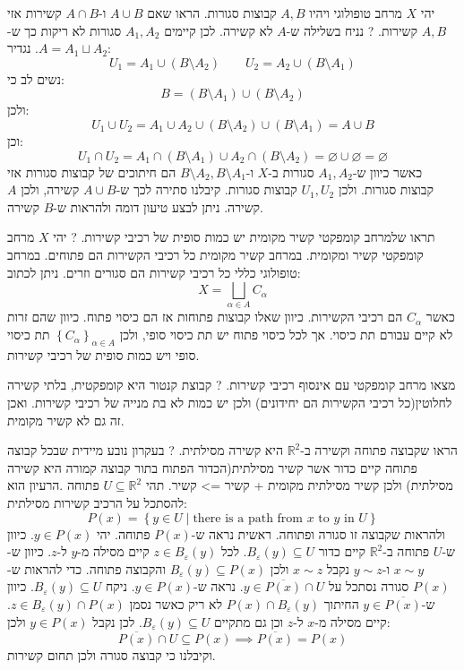 \documentclass{tstextbook}
\begin{document}
יהי \(X\) מרחב טופולוגי ויהיו \(A,B\) קבוצות סגורות. הראו שאם \(A\cup B\) ו-\(A\cap B\) קשירות אזי \(A,B\) קשירות.
?
נניח בשלילה ש-\(A\) לא קשירה. לכן קיימים \(A_{1},A_{2}\) סגורות לא ריקות כך ש-\(A=A_{1}\sqcup A_{2}\). נגדיר:
$$U_{1}=A_{1}\cup\left( B\setminus  A_{2} \right)\qquad U_{2}=A_{2}\cup \left( B\setminus  A_{1} \right)$$
נשים לב כי:
$$B=\left( B \setminus  A_{1} \right)\cup\left(  B \setminus  A_{2} \right)$$
ולכן:
$$U_{1}\cup U_{2}=A_{1}\cup A_{2}\cup\left( B\setminus  A_{2} \right)\cup \left( B\setminus  A_{1} \right)=A\cup B$$
וכן:
$$U_{1}\cap U_{2}=A_{1}\cap \left( B \setminus  A_{1} \right)\cup A_{2} \cap \left( B \setminus  A_{2} \right)=\varnothing \cup \varnothing =\varnothing $$
כאשר כיוון ש-\(A_{1},A_{2}\) סגורות ב-\(X\) ו-\(B \setminus A_{2},B\setminus A_{1}\) הם חיתוכים של קבוצות סגורות אזי קבוצות סגורות. ולכן \(U_{1},U_{2}\) קבוצות סגורות. קיבלנו סתירה לכך ש-\(A\cup B\) קשירה, ולכן \(A\) קשירה. ניתן לבצע טיעון דומה ולהראות ש-\(B\) קשירה.

תראו שלמרחב קומפקטי קשיר מקומית יש כמות סופית של רכיבי קשירות.
?
יהי \(X\) מרחב קומפקטי קשיר ומקומית. במרחב קשיר מקומית כל רכיבי הקשירות הם פתוחים. במרחב טופולוגי כללי כל רכיבי קשירות הם סגורים וזרים. ניתן לכתוב:
$$X=\bigsqcup_{\alpha \in A}C_{\alpha}$$
כאשר \(C_{\alpha}\) הם רכיבי הקשירות. כיוון שאלו קבוצות פתוחות אז הם כיסוי פתוח. כיוון שהם זרות לא קיים עבורם תת כיסוי. אך לכל כיסוי פתוח יש תת כיסוי סופי, ולכן \(\left\{  C_{\alpha}  \right\}_{\alpha \in A}\) תת כיסוי סופי ויש כמות סופית של רכיבי קשירות.

מצאו מרחב קומפקטי עם אינסוף רכיבי קשירות.
?
קבוצת קנטור היא קומפקטית, בלתי קשירה לחלוטין(כל רכיבי הקשירות הם יחידונים) ולכן יש כמות לא בת מנייה של רכיבי קשירות. ואכן זה גם לא קשיר מקומית.

הראו שקבוצה פתוחה וקשירה ב-\(\mathbb{R}^{2}\) היא קשירה מסילתית.
?
בעקרון נובע מיידית שבכל קבוצה פתוחה קיים כדור אשר קשיר מסילתית(הכדור הפתוח בתור קבוצה קמורה היא קשירה מסילתית) ולכן קשיר מסילתית מקומית + קשיר => קשיר. 
תהי \(U\subseteq \mathbb{R}^{2}\) פתוחה .הרעיון הוא להסתכל על הרכיב קשירות מסילתית:
$$P(x)=\left\{  y \in U  \mid \text{there is a path from } x \text{ to } y \text{ in }U\right\}$$
ולהראות שקבוצה זו סגורה ופתוחה. ראשית נראה ש-\(P(x)\) פתוחה. יהי \(y \in P(x)\). כיוון ש-\(U\) פתוחה ב-\(\mathbb{R}^{2}\) קיים כדור \(B_{\varepsilon}(y)\subseteq U\). לכל \(z \in B_{\varepsilon}(y)\) קיים מסילה מ-\(y\) ל-\(z\). כיוון ש-\(x \sim y\) ו-\(y \sim z\) נקבל \(x \sim z\) ולכן \(B_{\varepsilon}(y)\subseteq P(x)\) והקבוצה פתוחה. 
כדי להראות ש-\(P(x)\) סגורה נסתכל על \(y \in \overline{P(x)}\cap U\). נראה ש-\(y \in P(x)\). ניקח \(B_{\varepsilon}(y)\subseteq U\). כיוון ש-\(y \in \overline{P(x)}\) החיתוך \(P(x)\cap B_{\varepsilon}(y)\) לא ריק כאשר נסמן \(z \in B_{\varepsilon}(y)\cap P(x)\). קיים מסילה מ-\(x\) ל-\(z\) וכן גם מתקיים \(B_{\varepsilon}(y)\subseteq U\). לכן נקבל \(y \in P(x)\) ולכן:
$$\overline{P(x)} \cap U\subseteq P(x)\implies \overline{P(x)} =P(x)$$
וקיבלנו כי קבוצה סגורה ולכן תחום קשירות.
\end{document}
